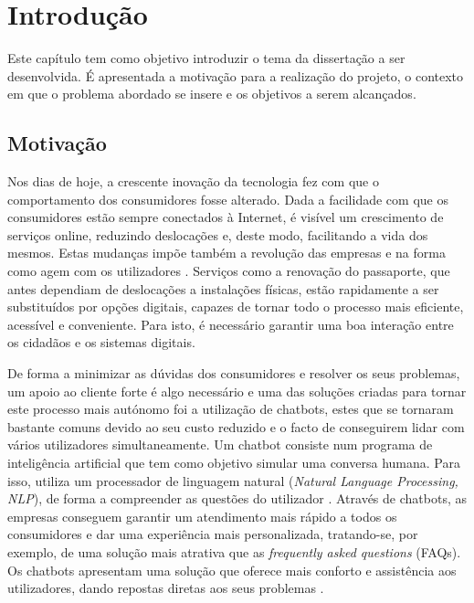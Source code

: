
%

\chapter{Introdução}
\label{cha:introduction}


\epigraphfontsize{\small\itshape}
\setlength\epigraphwidth{12.5cm}
\setlength\epigraphrule{0pt}

\noindent Este capítulo tem como objetivo introduzir o tema da dissertação a ser desenvolvida. 
É apresentada a motivação para a realização do projeto, o contexto em que o problema abordado se insere e os objetivos a serem alcançados. 

\section{Motivação}
\label{sec:motivation}

Nos dias de hoje, a crescente inovação da tecnologia fez com que o comportamento dos consumidores fosse alterado. 
Dada a facilidade com que os consumidores estão sempre conectados à Internet, é visível um crescimento de serviços online, reduzindo deslocações e, deste modo, facilitando 
a vida dos mesmos. Estas mudanças impõe também a revolução das empresas e na forma como agem com os utilizadores \cite{LuisMarineYousef}\cite{Uma}. 
Serviços como a renovação do passaporte, que antes dependiam de deslocações a instalações físicas, estão rapidamente a ser substituídos por opções digitais, 
capazes de tornar todo o processo mais eficiente, acessível e conveniente. Para isto, é necessário garantir uma boa interação entre os cidadãos e os sistemas digitais.

De forma a minimizar as dúvidas dos consumidores e resolver os seus problemas, um apoio ao cliente forte é algo necessário e uma das soluções criadas 
para tornar este processo mais autónomo foi a utilização de chatbots, estes que se tornaram bastante comuns devido ao seu custo reduzido e o facto de 
conseguirem lidar com vários utilizadores simultaneamente.
Um chatbot consiste num programa de inteligência artificial que tem como objetivo simular uma conversa humana. Para isso, utiliza um processador de linguagem natural
(\textit{Natural Language Processing, NLP}), de forma a compreender as questões do utilizador \cite{Eleni}. 
Através de chatbots, as empresas conseguem garantir um atendimento mais rápido a todos os consumidores e dar uma experiência mais personalizada, tratando-se, por exemplo, 
de uma solução mais atrativa que as \textit{frequently asked questions} (FAQs). Os chatbots apresentam uma solução que oferece mais conforto e assistência aos 
utilizadores, dando repostas diretas aos seus problemas \cite{AdamopoulouMoussiades}.

